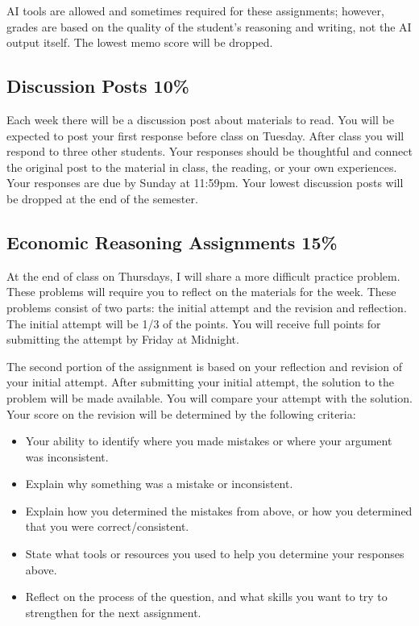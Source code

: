 \documentclass[
]{book}
\providecommand{\tightlist}{%
  \setlength{\itemsep}{0pt}\setlength{\parskip}{0pt}}
\begin{document}
AI tools are allowed and sometimes required for these assignments; however, grades are based on the quality of the student's reasoning and writing, not the AI output itself. The lowest memo score will be dropped.

\subsection*{Discussion Posts 10\%}\label{discussion-posts-10}

Each week there will be a discussion post about materials to read. You will be expected to post your first response before class on Tuesday. After class you will respond to three other students. Your responses should be thoughtful and connect the original post to the material in class, the reading, or your own experiences. Your responses are due by Sunday at 11:59pm. Your lowest discussion posts will be dropped at the end of the semester.

\subsection*{Economic Reasoning Assignments 15\%}\label{economic-reasoning-assignments-15}

At the end of class on Thursdays, I will share a more difficult practice problem. These problems will require you to reflect on the materials for the week. These problems consist of two parts: the initial attempt and the revision and reflection. The initial attempt will be 1/3 of the points. You will receive full points for submitting the attempt by Friday at Midnight.

The second portion of the assignment is based on your reflection and revision of your initial attempt. After submitting your initial attempt, the solution to the problem will be made available. You will compare your attempt with the solution. Your score on the revision will be determined by the following criteria:

\begin{itemize}
\tightlist
\item
  Your ability to identify where you made mistakes or where your argument was inconsistent.
\item
  Explain why something was a mistake or inconsistent.
\item
  Explain how you determined the mistakes from above, or how you determined that you were correct/consistent.
\item
  State what tools or resources you used to help you determine your responses above.
\item
  Reflect on the process of the question, and what skills you want to try to strengthen for the next assignment.
\end{itemize}
\end{document}
